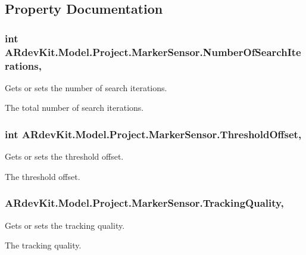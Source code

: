 \subsection{Property Documentation}
\hypertarget{class_a_rdev_kit_1_1_model_1_1_project_1_1_marker_sensor_a106f06e0fb75947b4748a392e7a520b7}{
\subsubsection[{Number\-Of\-Search\-Iterations}]{\setlength{\rightskip}{0pt plus 5cm}int A\-Rdev\-Kit.\-Model.\-Project.\-Marker\-Sensor.\-Number\-Of\-Search\-Iterations\hspace{0.3cm}{\ttfamily [get]}, {\ttfamily [set]}}}\label{class_a_rdev_kit_1_1_model_1_1_project_1_1_marker_sensor_a106f06e0fb75947b4748a392e7a520b7}


Gets or sets the number of search iterations. 

The total number of search iterations. \hypertarget{class_a_rdev_kit_1_1_model_1_1_project_1_1_marker_sensor_a704b4bc065e8b27d457c2cfbedee7a79}{
\subsubsection[{Threshold\-Offset}]{\setlength{\rightskip}{0pt plus 5cm}int A\-Rdev\-Kit.\-Model.\-Project.\-Marker\-Sensor.\-Threshold\-Offset\hspace{0.3cm}{\ttfamily [get]}, {\ttfamily [set]}}}\label{class_a_rdev_kit_1_1_model_1_1_project_1_1_marker_sensor_a704b4bc065e8b27d457c2cfbedee7a79}


Gets or sets the threshold offset. 

The threshold offset. \hypertarget{class_a_rdev_kit_1_1_model_1_1_project_1_1_marker_sensor_ad8681106fa33f5473799f0e0ed6999bc}{
\subsubsection[{Tracking\-Quality}]{ A\-Rdev\-Kit.\-Model.\-Project.\-Marker\-Sensor.\-Tracking\-Quality\hspace{0.3cm}{\ttfamily [get]}, {\ttfamily [set]}}}\label{class_a_rdev_kit_1_1_model_1_1_project_1_1_marker_sensor_ad8681106fa33f5473799f0e0ed6999bc}


Gets or sets the tracking quality. 

The tracking quality. 